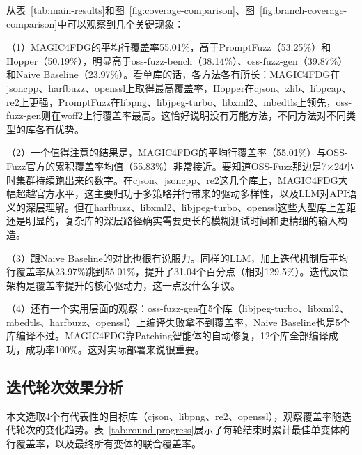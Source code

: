 从表~\ref{tab:main-results}和图~\ref{fig:coverage-comparison}、图~\ref{fig:branch-coverage-comparison}中可以观察到几个关键现象：

（1）MAGIC4FDG的平均行覆盖率55.01\%，高于PromptFuzz（53.25\%）和Hopper（50.19\%），明显高于oss-fuzz-bench（38.14\%）、oss-fuzz-gen（39.87\%）和Naive Baseline（23.97\%）。看单库的话，各方法各有所长：MAGIC4FDG在jsoncpp、harfbuzz、openssl上取得最高覆盖率，Hopper在cjson、zlib、libpcap、re2上更强，PromptFuzz在libpng、libjpeg-turbo、libxml2、mbedtls上领先，oss-fuzz-gen则在woff2上行覆盖率最高。这恰好说明没有万能方法，不同方法对不同类型的库各有优势。

（2）一个值得注意的结果是，MAGIC4FDG的平均行覆盖率（55.01\%）与OSS-Fuzz官方的累积覆盖率均值（55.83\%）非常接近。要知道OSS-Fuzz那边是7$\times$24小时集群持续跑出来的数字。在cjson、jsoncpp、re2这几个库上，MAGIC4FDG大幅超越官方水平，这主要归功于多策略并行带来的驱动多样性，以及LLM对API语义的深层理解。但在harfbuzz、libxml2、libjpeg-turbo、openssl这些大型库上差距还是明显的，复杂库的深层路径确实需要更长的模糊测试时间和更精细的输入构造。

（3）跟Naive Baseline的对比也很有说服力。同样的LLM，加上迭代机制后平均行覆盖率从23.97\%跳到55.01\%，提升了31.04个百分点（相对129.5\%）。迭代反馈架构是覆盖率提升的核心驱动力，这一点没什么争议。

（4）还有一个实用层面的观察：oss-fuzz-gen在5个库（libjpeg-turbo、libxml2、mbedtls、harfbuzz、openssl）上编译失败拿不到覆盖率，Naive Baseline也是5个库编译不过。MAGIC4FDG靠Patching智能体的自动修复，12个库全部编译成功，成功率100\%。这对实际部署来说很重要。

\subsection{迭代轮次效果分析}

本文选取4个有代表性的目标库（cjson、libpng、re2、openssl），观察覆盖率随迭代轮次的变化趋势。表~\ref{tab:round-progress}展示了每轮结束时累计最佳单变体的行覆盖率，以及最终所有变体的联合覆盖率。

\begin{table}[H]
    \centering
    \caption{代表性目标库覆盖率随轮次变化（行覆盖率\%）}
    \label{tab:round-progress}
\end{table}

